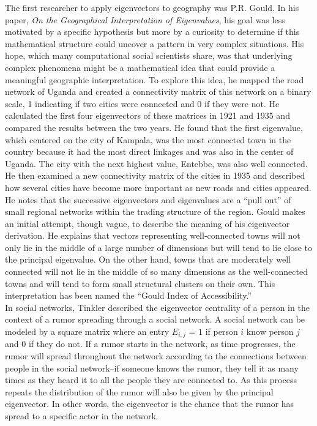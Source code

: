 \documentclass{article}
\theoremstyle{definition}
\theoremstyle{remark}
\begin{document}
The first researcher to apply eigenvectors to geography was P.R. Gould.  In his paper, \textit{On the Geographical Interpretation of Eigenvalues}, his goal was less motivated by a specific hypothesis but more by a curiosity to determine if this mathematical structure could uncover a pattern in very complex situations.\cite{gould1967geographical}  His hope, which many computational social scientists share, was that underlying complex phenomena might be a mathematical idea that could provide a meaningful geographic interpretation.  To explore this idea, he mapped the road network of Uganda and created a connectivity matrix of this network on a binary scale, 1 indicating if two cities were connected and 0 if they were not.  He calculated the first four eigenvectors of these matrices in 1921 and 1935 and compared the results between the two years.  He found that the first eigenvalue, which centered on the city of Kampala, was the most connected town in the country because it had the most direct linkages and was also in the center of Uganda.  The city with the next highest value, Entebbe, was also well connected.  He then examined a new connectivity matrix of the cities in 1935 and described how several cities have become more important as new roads and cities appeared.  He notes that the successive eigenvectors and eigenvalues are a “pull out” of small regional networks within the trading structure of the region.  Gould makes an initial attempt, though vague, to describe the meaning of his eigenvector derivation.  He explains that vectors representing well-connected towns will not only lie in the middle of a large number of dimensions but will tend to lie close to the principal eigenvalue.  On the other hand, towns that are moderately well connected will not lie in the middle of so many dimensions as the well-connected towns and will tend to form small structural clusters on their own.  This interpretation has been named the “Gould Index of Accessibility.” \\

In social networks, Tinkler described the eigenvector centrality of a person in the context of a rumor spreading through a social network.  A social network can be modeled by a square matrix where an entry $E_{i,j}$ = $1$ if person $i$ know person $j$ and $0$ if they do not.  If a rumor starts in the network, as time progresses, the rumor will spread throughout the network according to the connections between people in the social network--if someone knows the rumor, they tell it as many times as they heard it to all the people they are connected to.  As this process repeats the distribution of the rumor will also be given by the principal eigenvector.  In other words, the eigenvector is the chance that the rumor has spread to a specific actor in the network.\cite{tinkler1972physical} \\
\end{document}
